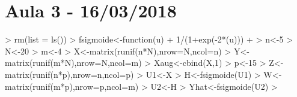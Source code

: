\documentclass{article}
\begin{document}


\section{Aula 3 - 16/03/2018}

\begin{Schunk}
\begin{Sinput}
> rm(list = ls())
> fsigmoide<-function(u){
+   1/(1+exp(-2*(u)))
+ }
> n<-5
> N<-20
> m<-4
> X<-matrix(runif(n*N),nrow=N,ncol=n)
> Y<-matrix(runif(m*N),nrow=N,ncol=m)
> Xaug<-cbind(X,1)
> p<-15
> Z<-matrix(runif(n*p),nrow=n,ncol=p)
> U1<-X %*% Z
> H<-fsigmoide(U1)
> W<-matrix(runif(m*p),nrow=p,ncol=m)
> U2<-H %*% W
> Yhat<-fsigmoide(U2)
> 
\end{Sinput}
\end{Schunk}
\end{document}
